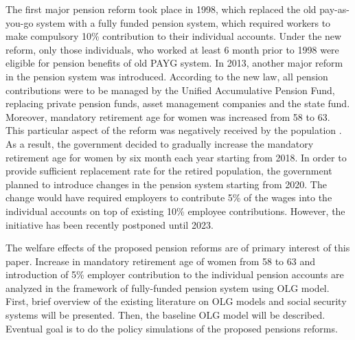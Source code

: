 \documentclass[ProjectUYA]{subfiles}
\begin{document}
The first major pension reform took place in 1998, which replaced the old pay-as-you-go system with a fully funded pension system, which required workers to make compulsory 10\% contribution to their individual accounts. Under the new reform, only those individuals, who worked at least 6 month prior to 1998 were eligible for pension benefits of old PAYG system. In 2013, another major reform in the pension system was introduced. According to the new law, all pension contributions were to be managed by the Unified Accumulative Pension Fund, replacing private pension funds, asset management companies and the state fund. Moreover, mandatory retirement age for women was increased from 58 to 63. This particular aspect of the reform was negatively received by the population \cite{maltseva}. As a result, the government decided to gradually increase the mandatory retirement age for women by six month each year starting from 2018. In order to provide sufficient replacement rate for the retired population, the government planned to introduce changes in the pension system starting from 2020. The change would have required employers to contribute 5\% of the wages into the individual accounts on top of existing 10\% employee contributions. However, the initiative has been recently postponed until 2023.



The welfare effects of the proposed pension reforms are of primary interest of this paper. Increase in mandatory retirement age of women from 58 to 63 and introduction of 5\% employer contribution to the individual pension accounts are analyzed in the framework of fully-funded pension system using OLG model. First, brief overview of the existing literature on OLG models and social security systems will be presented. Then, the baseline OLG model will be described. Eventual goal is to do the policy simulations of the proposed pensions reforms. 
\end{document}
